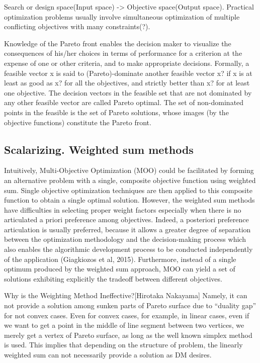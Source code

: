         Search or design space(Input space) -> Objective space(Output space).
        Practical optimization problems usually involve simultaneous optimization of multiple conflicting objectives with many constraints(?).

        Knowledge of the Pareto front enables the decision maker to visualize the consequences of his/her choices in terms of performance 
        for a criterion at the expense of one or other criteria, and to make appropriate decisions. Formally, a feasible vector x is said to (Pareto)-dominate another feasible vector x? if
        x is at least as good as x? for all the objectives, and strictly better than x? for at least one objective. The decision vectors in the feasible set 
        that are not dominated by any other feasible vector are called Pareto optimal. The set of non-dominated points in the 
        feasible is the set of Pareto solutions, whose images (by the objective functions) constitute the Pareto front.\cite{Audet2018PerformanceII}


        \subsection{Scalarizing. Weighted sum methods}
            Intuitively, Multi-Objective Optimization (MOO) could be
            facilitated by forming an alternative problem with a single,
            composite objective function using weighted sum. Single
            objective optimization techniques are then applied to this
            composite function to obtain a single optimal solution.
            However, the weighted sum methods have difficulties in
            selecting proper weight factors especially when there is no
            articulated a priori preference among objectives. Indeed, a
            posteriori preference articulation is usually preferred, because it
            allows a greater degree of separation between the optimization
            methodology and the decision-making process which also
            enables the algorithmic development process to be conducted
            independently of the application (Giagkiozos et al, 2015).
            Furthermore, instead of a single optimum produced by the
            weighted sum approach, MOO can yield a set of solutions
            exhibiting explicitly the tradeoff between different objectives. \cite{DBLP:journals/corr/abs-1812-07958}


            Why is the Weighting Method Ineffective?[Hirotaka Nakayama]
            Namely, it can not provide a solution among sunken parts of Pareto surface due to “duality gap” for not convex cases. 
            Even for convex cases, for example, in linear cases, even if we want to get a point in the middle of line segment between two vertices, we merely get a vertex of Pareto surface, as
            long as the well known simplex method is used. This implies that depending on the structure of problem, the linearly weighted sum can not necessarily provide a solution as DM desires.


